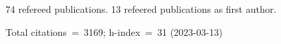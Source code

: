 74 refereed publications. 13 refeered publications as first author.

Total citations~=~3169; h-index~=~31 (2023-03-13)